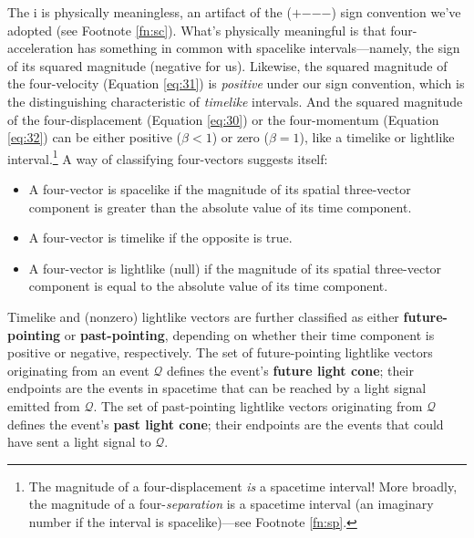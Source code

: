 \documentclass[12pt]{article}
\begin{document}
The $\mathrm{i}$ is physically meaningless, an artifact of the ($+$$-$$-$$-$) sign convention we've adopted (see Footnote \ref{fn:sc}). What's physically meaningful is that four-acceleration has something in common with spacelike intervals---namely, the sign of its squared magnitude (negative for us). Likewise, the squared magnitude of the four-velocity (Equation \ref{eq:31}) is \emph{positive} under our sign convention, which is the distinguishing characteristic of \emph{timelike} intervals. And the squared magnitude of the four-displacement (Equation \ref{eq:30}) or the four-momentum (Equation \ref{eq:32}) can be either positive ($\beta < 1$) or zero ($\beta = 1$), like a timelike or lightlike interval.\footnote{The magnitude of a four-displacement \emph{is} a spacetime interval! More broadly, the magnitude of a four-\emph{separation} is a spacetime interval (an imaginary number if the interval is spacelike)---see Footnote \ref{fn:sp}.} A way of classifying four-vectors suggests itself:
\begin{itemize}
\item A four-vector is spacelike if the magnitude of its spatial three-vector component is greater than the absolute value of its time component.
\item A four-vector is timelike if the opposite is true.
\item A four-vector is lightlike (null) if the magnitude of its spatial three-vector component is equal to the absolute value of its time component.
\end{itemize}

Timelike and (nonzero) lightlike vectors are further classified as either \textbf{future-pointing} or \textbf{past-pointing}, depending on whether their time component is positive or negative, respectively. The set of future-pointing lightlike vectors originating from an event $\mathcal{Q}$ defines the event's \textbf{future light cone}; their endpoints are the events in spacetime that can be reached by a light signal emitted from $\mathcal{Q}$. The set of past-pointing lightlike vectors originating from $\mathcal{Q}$ defines the event's \textbf{past light cone}; their endpoints are the events that could have sent a light signal to $\mathcal{Q}$.
\end{document}

